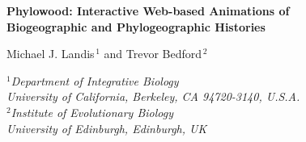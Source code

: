 \documentclass[11pt]{article}
\begin{document}


\begin{titlepage}
\begin{center}
{\Large\bf Phylowood: Interactive Web-based Animations of \\ Biogeographic and Phylogeographic Histories}

\bigskip

{\sc Michael J. Landis$^{\,1}$ and Trevor Bedford$^{\,2}$} \\

\bigskip

{\em
$\mbox{}^1$Department of Integrative Biology\\
\vspace{-0.4\baselineskip}
University of California, Berkeley, CA 94720-3140, \mbox{U.S.A.} \\

$\mbox{}^2$Institute of Evolutionary Biology\\
\vspace{-0.4\baselineskip}
University of Edinburgh, Edinburgh, UK \\
}
\end{center}

\bigskip

\begin{abstract}

 Phylowood is a web service that uses Javascript to generate in-browser animations of biogeographic and phylogeographic histories from annotated phylogenetic input. The animations are interactive, allowing the user to adjust spatial and temporal resolution, and highlight phylogenetic lineages of interest.

 All documentation and source code for Phylowood is freely available at \\
\texttt{https://github.com/mlandis/phylowood} and a live web application is available at \\
\texttt{https://mlandis.github.io/phylowood}.

 mlandis@berkeley.edu

\end{abstract}

\end{titlepage}

\end{document}
